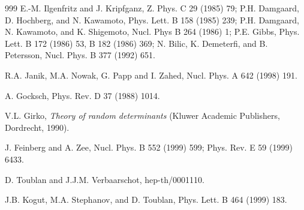 \begin{thebibliography}{999}
      E.-M. Ilgenfritz and J. Kripfganz, 
                      Z. Phys. C 29 (1985) 79;                 %
                      P.H. Damgaard, D. Hochberg, and N. Kawamoto, 
                      Phys. Lett. B 158 (1985) 239;                 %
                      P.H. Damgaard, N. Kawamoto, and K. Shigemoto,
                      Nucl. Phys B 264 (1986) 1;                    %
                      P.E. Gibbs, Phys. Lett. B 172 (1986) 53,      %
                                              B 182 (1986) 369;     %
                      N. Bilic, K. Demeterfi, and B. Petersson, 
                      Nucl. Phys. B 377 (1992) 651.                 %

        R.A. Janik, M.A. Nowak, G. Papp and I. Zahed, 
                      Nucl. Phys. A 642 (1998) 191.                 %

      A. Gocksch, 
                      Phys. Rev. D 37 (1988) 1014.                  %

       V.L. Girko, 
                      {\it Theory of random determinants}
                      (Kluwer Academic Publishers, Dordrecht, 1990).  %

        J. Feinberg and A. Zee,
                      Nucl. Phys. B 552 (1999) 599;                   %
                      Phys. Rev. E 59 (1999) 6433.

       D. Toublan and J.J.M. Verbaarschot, 
                      hep-th/0001110.                           %

         J.B. Kogut, M.A. Stephanov, and D. Toublan, 
                      Phys. Lett. B 464 (1999) 183.             %


\end{thebibliography}
